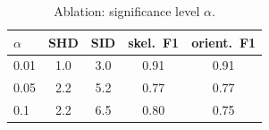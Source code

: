 \begin{table}[htbp]
\centering
\caption{Ablation: significance level $\alpha$.}
\label{tab:abl_alpha}
\begin{tabular}{lcccc}
\hline
$\alpha$ & SHD & SID & skel.\ F1 & orient.\ F1 \\
\hline
0.01 & 1.0 & 3.0 & 0.91 & 0.91 \\
0.05 & 2.2 & 5.2 & 0.77 & 0.77 \\
0.1 & 2.2 & 6.5 & 0.80 & 0.75 \\
\hline
\end{tabular}
\end{table}
